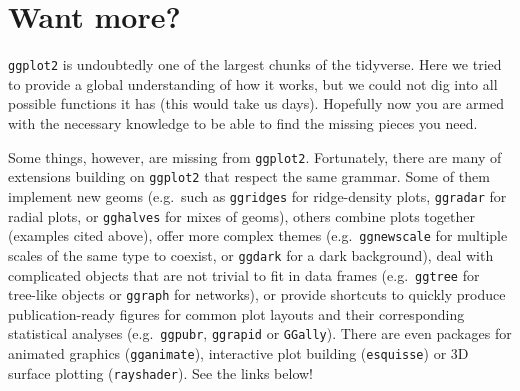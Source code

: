 \documentclass[]{book}
\newenvironment{Shaded}{}{}
\newcommand{\CommentTok}[1]{\textcolor[rgb]{0.38,0.63,0.69}{\textit{#1}}}
\newcommand{\DataTypeTok}[1]{\textcolor[rgb]{0.56,0.13,0.00}{#1}}
\newcommand{\KeywordTok}[1]{\textcolor[rgb]{0.00,0.44,0.13}{\textbf{#1}}}
\newcommand{\NormalTok}[1]{#1}
\newcommand{\OperatorTok}[1]{\textcolor[rgb]{0.40,0.40,0.40}{#1}}
\newcommand{\StringTok}[1]{\textcolor[rgb]{0.25,0.44,0.63}{#1}}
\begin{document}
\begin{Shaded}
\end{Shaded}

\hypertarget{want-more}{%
\section{Want more?}\label{want-more}}

\texttt{ggplot2} is undoubtedly one of the largest chunks of the tidyverse. Here we tried to provide a global understanding of how it works, but we could not dig into all possible functions it has (this would take us days). Hopefully now you are armed with the necessary knowledge to be able to find the missing pieces you need.

Some things, however, are missing from \texttt{ggplot2}. Fortunately, there are many of extensions building on \texttt{ggplot2} that respect the same grammar. Some of them implement new geoms (e.g.~such as \texttt{ggridges} for ridge-density plots, \texttt{ggradar} for radial plots, or \texttt{gghalves} for mixes of geoms), others combine plots together (examples cited above), offer more complex themes (e.g.~\texttt{ggnewscale} for multiple scales of the same type to coexist, or \texttt{ggdark} for a dark background), deal with complicated objects that are not trivial to fit in data frames (e.g.~\texttt{ggtree} for tree-like objects or \texttt{ggraph} for networks), or provide shortcuts to quickly produce publication-ready figures for common plot layouts and their corresponding statistical analyses (e.g.~\texttt{ggpubr}, \texttt{ggrapid} or \texttt{GGally}). There are even packages for animated graphics (\texttt{gganimate}), interactive plot building (\texttt{esquisse}) or 3D surface plotting (\texttt{rayshader}). See the links below!
\end{document}
